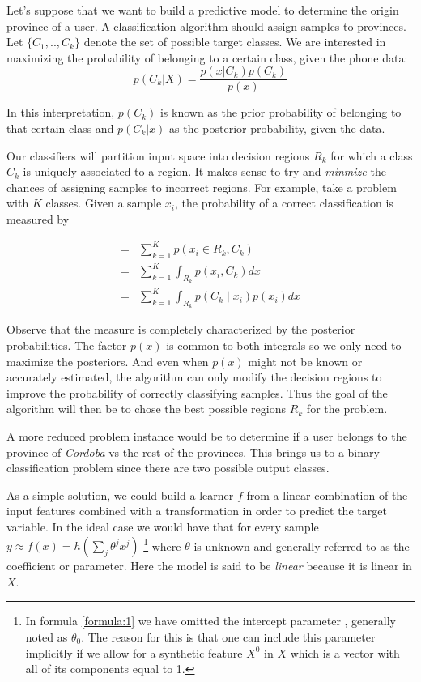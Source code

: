 Let's suppose that we want to build a predictive model to determine the origin province of a user. A classification algorithm should assign samples to provinces. Let $\{C_1,..,C_k\}$ denote the set of possible target classes. We are  interested in maximizing the probability of belonging to a certain class, given the phone data:
$$p(C_k| X) = \frac{p(x|C_k)p(C_k)}{p(x)} $$

In this interpretation, $p(C_k)$ is known as the prior probability of belonging to that certain class and $p(C_k|x)$ as the posterior probability, given the data.

Our classifiers will partition input space into decision regions $R_k$ for which a class $C_k$ is uniquely associated to a region. It makes sense to try and \textit{minmize} the chances of assigning samples to incorrect regions. For example, take a problem with $K$ classes. Given a sample $x_i$, the probability of a correct classification is measured by

\begin{equation}\label{eq:goodclassification-equation}
\begin{split}
=  & \sum_{k=1}^{K} p(x_i \in R_k, C_k )  \\
=  & \sum_{k=1}^{K} \int_{R_k}p(x_i,C_k) dx \\
=  & \sum_{k=1}^{K} \int_{R_k}p(C_k \mid x_i) p(x_i) dx
\end{split}
\end{equation}

Observe that the measure is completely characterized by the posterior probabilities. The factor $p(x)$ is common to both integrals so we only need to maximize the posteriors. And even when $p(x)$ might not be known or accurately estimated, the algorithm can only modify the decision regions to improve the probability of correctly classifying samples. Thus the goal of the algorithm will then be to chose the best possible regions $R_k$ for the problem.

A more reduced problem instance would be to determine if a user belongs to the province of \textit{Cordoba} vs the rest of the provinces. This brings us to a binary classification problem since there are two possible output classes. %

As a simple solution, we could build a learner $f$ from a  linear combination of the input features combined with a transformation in order to predict the target variable. In the ideal case we would have that for every sample $y \approx f(x) = h\left(\sum_{j}\theta^jx^j\right)$ \label{formula:1} \footnote{In formula \ref{formula:1} we have omitted the intercept parameter , generally noted as $\theta_0$. The reason for this is that one can include this parameter implicitly if we allow for a synthetic feature $X^0$ in $X$ which is a vector with all of its components equal to 1.  } where $\theta$ is unknown and generally referred to as the coefficient or parameter. Here the model is said to be \textit{linear} because it is linear in $X$.

